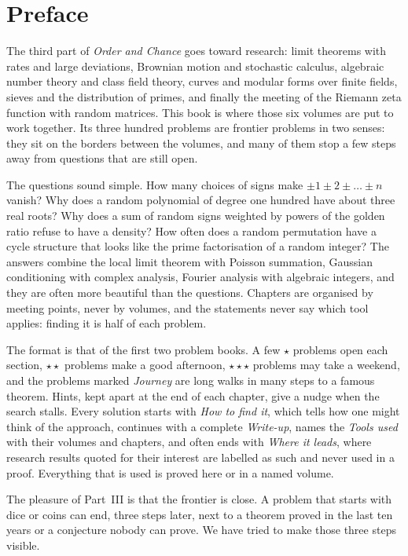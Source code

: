 \chapter*{Preface}
The third part of \emph{Order and Chance} goes toward research: limit theorems with rates and large deviations, Brownian
motion and stochastic calculus, algebraic number theory and class field theory, curves and modular forms over finite fields,
sieves and the distribution of primes, and finally the meeting of the Riemann zeta function with random matrices. This book
is where those six volumes are put to work together. Its three hundred problems are frontier problems in two senses: they sit
on the borders between the volumes, and many of them stop a few steps away from questions that are still open.

The questions sound simple. How many choices of signs make $\pm1\pm2\pm\dots\pm n$ vanish? Why does a random polynomial of
degree one hundred have about three real roots? Why does a sum of random signs weighted by powers of the golden ratio refuse
to have a density? How often does a random permutation have a cycle structure that looks like the prime factorisation of a
random integer? The answers combine the local limit theorem with Poisson summation, Gaussian conditioning with complex
analysis, Fourier analysis with algebraic integers, and they are often more beautiful than the questions. Chapters are
organised by meeting points, never by volumes, and the statements never say which tool applies: finding it is half of each
problem.

The format is that of the first two problem books. A few \textbf{$\star$} problems open each section, \textbf{$\star\star$}
problems make a good afternoon, \textbf{$\star\star\star$} problems may take a weekend, and the problems marked
\emph{Journey} are long walks in many steps to a famous theorem. Hints, kept apart at the end of each chapter, give a nudge
when the search stalls. Every solution starts with \emph{How to find it}, which tells how one might think of the approach,
continues with a complete \emph{Write-up}, names the \emph{Tools used} with their volumes and chapters, and often ends with
\emph{Where it leads}, where research results quoted for their interest are labelled as such and never used in a proof.
Everything that is used is proved here or in a named volume.


The pleasure of Part~III is that the frontier is close. A problem that starts with dice or coins can end, three steps later,
next to a theorem proved in the last ten years or a conjecture nobody can prove. We have tried to make those three steps
visible.

